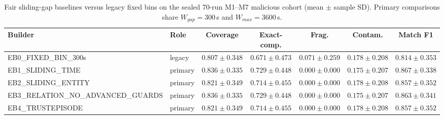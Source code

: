 \begin{table}[!t]
\caption{Fair sliding-gap baselines versus legacy fixed bins on the sealed 70-run M1--M7 malicious cohort
(mean $\pm$ sample SD). Primary comparisons share $W_{gap}=300$\,s and $W_{max}=3600$\,s.}
\label{tab:fair-baselines}
\centering
\scriptsize
\setlength{\tabcolsep}{4pt}
\begin{tabular}{@{}llccccc@{}}
\toprule
\textbf{Builder} & \textbf{Role} & \textbf{Coverage} & \textbf{Exact-comp.} & \textbf{Frag.} & \textbf{Contam.} & \textbf{Match F1} \\
\midrule
EB0\_FIXED\_BIN\_300s & legacy & $0.807\pm0.348$ & $0.671\pm0.473$ & $0.071\pm0.259$ & $0.178\pm0.208$ & $0.814\pm0.353$ \\
EB1\_SLIDING\_TIME & primary & $0.836\pm0.335$ & $0.729\pm0.448$ & $0.000\pm0.000$ & $0.175\pm0.207$ & $0.867\pm0.338$ \\
EB2\_SLIDING\_ENTITY & primary & $0.821\pm0.349$ & $0.714\pm0.455$ & $0.000\pm0.000$ & $0.178\pm0.208$ & $0.857\pm0.352$ \\
EB3\_RELATION\_NO\_ADVANCED\_GUARDS & primary & $0.836\pm0.335$ & $0.729\pm0.448$ & $0.000\pm0.000$ & $0.175\pm0.207$ & $0.863\pm0.341$ \\
EB4\_TRUSTEPISODE & primary & $0.821\pm0.349$ & $0.714\pm0.455$ & $0.000\pm0.000$ & $0.178\pm0.208$ & $0.857\pm0.352$ \\
\bottomrule
\end{tabular}
\end{table}
